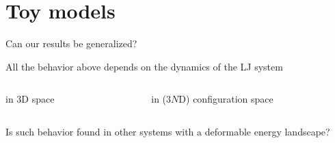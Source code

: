 \documentclass[compress]{beamer}
\begin{document}
	\section{Toy models}

	\begin{frame}{Can our results be generalized?}
		
		All the behavior above depends on the dynamics of the LJ system
		\begin{columns}[t]
			\begin{column}{0.5\textwidth}
				\begin{block}{\centering in 3D space}
					\begin{figure}
					\end{figure}
				\end{block}
			\end{column}
			\begin{column}{0.5\textwidth}
				\begin{block}{\centering in ($3N$D) configuration space}
					\begin{figure}
					\end{figure}
				\end{block}
			\end{column}
		\end{columns}

		Is such behavior found in other systems with a deformable energy landscape?
		
	\end{frame}
\end{document}
